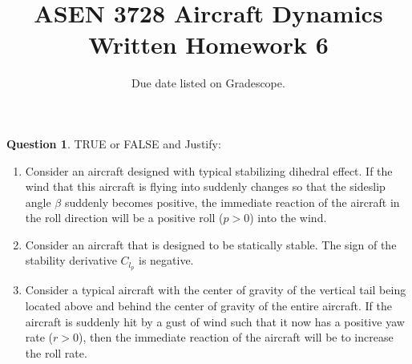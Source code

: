 \documentclass{article}
\title{ASEN 3728 Aircraft Dynamics\\Written Homework 6}
\date{Due date listed on Gradescope.}
\theoremstyle{definition}
\newtheorem{question}{Question}
\begin{document}
\maketitle

\begin{question} TRUE or FALSE and Justify:
    \begin{enumerate}
        \item Consider an aircraft designed with typical stabilizing dihedral effect. If the wind that this aircraft is flying into suddenly changes so that the sideslip angle $\beta$ suddenly becomes positive, the immediate reaction of the aircraft in the roll direction will be a positive roll ($p > 0$) into the wind.

        \item Consider an aircraft that is designed to be statically stable. The sign of the stability derivative $C_{l_p}$ is negative.

        \item Consider a typical aircraft with the center of gravity of the vertical tail being located above and behind the center of gravity of the entire aircraft. If the aircraft is suddenly hit by a gust of wind such that it now has a positive yaw rate ($r > 0$), then the immediate reaction of the aircraft will be to increase the roll rate.
    \end{enumerate}
\end{question}

\vspace{0.1cm}
\clearpage
\end{document}
